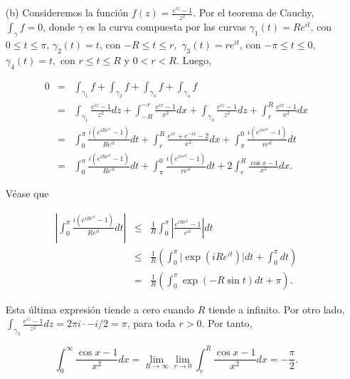 \documentclass[12pt]{article}
\begin{document}
\begin{itemize}
    \item[(b)] Consideremos la función $f(z) = \frac{e^{iz}-1}{z^2}$. Por el teorema de Cauchy, $\int_\gamma f = 0$, donde $\gamma$ es la curva compuesta por las curvas $\gamma_1(t) = R e^{it}$, con $0 \leq t \leq \pi $, $\gamma_2(t) = t$, con $-R \leq t \leq r,$ $\gamma_3(t) = r e^{it}$, con $-\pi \leq t \leq 0$,  $\gamma_4(t) = t,$ con $r \leq t \leq R$ y $0 < r < R.$ Luego, 
    
    \begin{eqnarray*}
    0 &=& \int_{\gamma_1} f + \int_{\gamma_2} f + \int_{\gamma_3} f + \int_{\gamma_4} f \\
    &=& \int_{\gamma_1} \frac{e^{iz}-1}{z^2} dz  + \int_{-R}^{-r} \frac{e^{ix}-1}{x^2}dx + \int_{\gamma_3} \frac{e^{iz}-1}{z^2} dz + \int_{r}^R \frac{e^{ix}-1}{x^2}dx  \\
    &=& \int_0^\pi \frac{i(e^{iR e^{it}}-1)}{R e^{it}} dt + \int_r^R \frac{e^{ix} + e^{-ix}-2}{x^2}dx + \int_\pi^{0} \frac{i (e^{i r e^{it}}-1)}{r e^{it}} dt\\
    &=&  \int_0^\pi \frac{i(e^{iR e^{it}}-1)}{R e^{it}} dt +  \int_\pi^{0} \frac{i (e^{i r e^{it}}-1)}{r e^{it}} dt + 2 \int_r^R \frac{\cos x - 1}{x^2}dx.
    \end{eqnarray*}
    
    Véase que 
    
    \begin{eqnarray*}
    \left\lvert \int_0^\pi \frac{i(e^{iR e^{it}}-1)}{R e^{it}} dt \right\rvert &\leq& \frac{1}{R} \int_0^\pi{\left\lvert \frac{e^{i R e^{it} }-1}{e^{it}} \right\rvert} dt\\
    &\leq& \frac{1}{R} \left( \int_0^\pi\lvert \exp{(iRe^{it})} \rvert dt + \int_0^\pi dt \right) \\
    &=& \frac{1}{R} \left(\int_0^\pi \exp{(- R \sin t)} dt + \pi \right).
    \end{eqnarray*}
    
    Esta última expresión tiende a cero cuando $R$ tiende a infinito. Por otro lado, $\int_{\gamma_3} \frac{e^{iz}-1}{z^2} dz = 2\pi i \cdot  -i/2 =  \pi$, para toda $r > 0$. Por tanto, 
    
    $$\int_{0}^\infty \frac{\cos x - 1}{x^2} dx = \lim_{R \to \infty } \lim_{r \to 0} \int_{r}^R \frac{\cos x -1 }{x^2}dx = - \frac{\pi}{2}.$$

\end{itemize}
\end{document}

